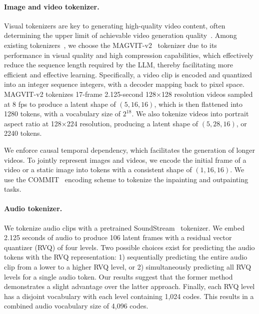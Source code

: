 \paragraph{Image and video tokenizer.}
Visual tokenizers are key to generating high-quality video content, often determining the upper limit of achievable video generation quality~\cite{yu2023language}.
%
Among existing tokenizers~\cite{esser2020taming,villegas2022phenaki,yu2023magvit,yu2023spae}, we choose the MAGVIT-v2~\cite{yu2023language} tokenizer due to its performance in visual quality and high compression capabilities, which effectively reduce the sequence length required by the LLM, thereby facilitating more efficient and effective learning.
%
%
Specifically, a video clip is encoded and quantized into an
integer sequence integers, with a decoder mapping back to  pixel space. MAGVIT-v2 tokenizes 17-frame 2.125-second 128$\times$128 resolution videos sampled at 8 fps to produce a latent shape of $(5, 16, 16)$, which is then flattened into 1280 tokens, with a vocabulary size of $2^{18}$. %
We also tokenize videos into portrait aspect ratio at 128$\times$224 resolution, producing a latent shape of $(5, 28, 16)$, or 2240 tokens.

\vspace{-1mm}
We enforce causal temporal dependency, which facilitates the generation of longer videos. 
%
To jointly represent images and videos, we encode the initial frame of a video or a static image into tokens with a consistent shape of $(1, 16, 16)$.
We use the COMMIT~\cite{yu2023magvit} encoding scheme to tokenize the inpainting and outpainting tasks. 


\vspace{-4mm}
\paragraph{Audio tokenizer.} We tokenize audio clips with a pretrained SoundStream~\cite{zeghidour2021soundstream} tokenizer.
%
We embed 2.125 seconds of audio to produce 106 latent frames with a residual vector quantizer (RVQ) of four levels.
%
Two possible choices exist for predicting the audio tokens with the RVQ representation: 1) sequentially predicting the entire audio clip from a lower to a higher RVQ level, or 2) simultaneously predicting all RVQ levels for a single audio token. Our results suggest that the former method demonstrates a slight advantage over the latter approach.
Finally, each RVQ level has a disjoint vocabulary with each level containing 1,024 codes.
%
This results in a combined audio vocabulary size of 4,096 codes.

